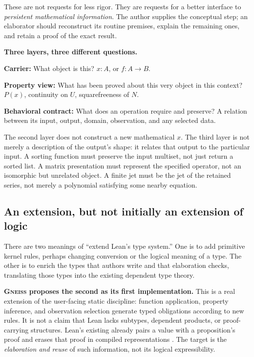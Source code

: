 \documentclass[11pt,letterpaper]{article}
\newcommand{\code}[1]{\texttt{\detokenize{#1}}}
\newcommand{\Gneiss}{\textsc{Gneiss}}
\theoremstyle{definition}
\theoremstyle{remark}
\begin{document}
These are not requests for less rigor. They are requests for a better interface
to \emph{persistent mathematical information}. The author supplies the conceptual
step; an elaborator should reconstruct its routine premises, explain the
remaining ones, and retain a proof of the exact result.

\begin{designbox}
\textbf{Three layers, three different questions.}

\textbf{Carrier:} What object is this?\quad
$x:A$, or $f:A\to B$.

\textbf{Property view:} What has been proved about this very object in this
context?\quad $P(x)$, continuity on $U$, squarefreeness of $N$.

\textbf{Behavioral contract:} What does an operation require and preserve?\quad
A relation between its input, output, domain, observation, and any selected data.
\end{designbox}

The second layer does not construct a new mathematical $x$. The third layer is
not merely a description of the output's shape: it relates that output to the
particular input. A sorting function must preserve the input multiset, not just
return a sorted list. A matrix presentation must represent the specified
operator, not an isomorphic but unrelated object. A finite jet must be the jet
of the retained series, not merely a polynomial satisfying some nearby equation.

\subsection{An extension, but not initially an extension of logic}
There are two meanings of ``extend Lean's type system.'' One is to add primitive
kernel rules, perhaps changing conversion or the logical meaning of a type. The
other is to enrich the types that authors write and that elaboration checks,
translating those types into the existing dependent type theory.

\textbf{\Gneiss{} proposes the second as its first implementation.} This is a real
extension of the user-facing static discipline: function application, property
inference, and observation selection generate typed obligations according to
new rules. It is not a claim that Lean lacks subtypes, dependent products, or
proof-carrying structures. Lean's existing \code{Subtype} already pairs a value
with a proposition's proof and erases that proof in compiled representations
\cite{lean-subtypes}. The target is the \emph{elaboration and reuse} of such
information, not its logical expressibility.
\end{document}
